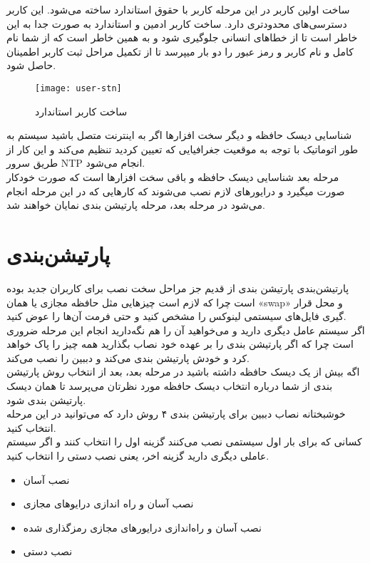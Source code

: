 \begin{frame}{ساخت اولین کاربر}
  در این مرحله کاربر با حقوق استاندارد ساخته می‌شود. این کاربر دسترسی‌های محدودتری دارد. ساخت کاربر ادمین و استاندارد به صورت جدا به این خاطر است تا از خطاهای انسانی جلوگیری شود و به همین خاطر است که از شما نام کامل و نام کاربر و رمز عبور را دو بار میپرسد تا از تکمیل مراحل ثبت کاربر اطمینان حاصل شود.
  \begin{figure}
    \texttt{[image: user-stn]}
    \caption{ساخت کاربر استاندارد~\cite{fig:deb_user_stn}}
  \end{figure}
\end{frame}
\begin{frame}{شناسایی دیسک حافظه و دیگر سخت افزارها}
  اگر به اینترنت متصل باشید سیستم به طور اتوماتیک با توجه به موقعیت جغرافیایی که تعیین کردید تنظیم می‌کند و این کار از طریق سرور NTP انجام می‌شود.\\
  مرحله بعد شناسایی دیسک حافظه و باقی سخت افزارها است که صورت خودکار صورت میگیرد و درایورهای لازم نصب می‌شوند که کارهایی که در این مرحله انجام می‌شود در مرحله بعد، مرحله پارتیشن بندی نمایان خواهند شد.
\end{frame}
\section{پارتیشن‌بندی}
\begin{frame}{پارتیشن‌بندی}
  پارتیشن بندی از قدیم جز مراحل سخت نصب برای کاربران جدید بوده است چرا که لازم است چیزهایی مثل حافظه مجازی یا همان «swap» و محل قرار گیری فایل‌های سیستمی لینوکس را مشخص کنید و حتی فرمت آن‌ها را عوض کنید.\\
  اگر سیستم عامل دیگری دارید و می‌خواهید آن را هم نگه‌دارید انجام این مرحله ضروری است چرا که اگر پارتیشن بندی را بر عهده خود نصاب بگذارید همه چیز را پاک خواهد کرد و خودش پارتیشن بندی می‌کند و دببین را نصب می‌کند.\\
  اگه بیش از یک دیسک حافظه داشته باشید در مرحله بعد، بعد از انتخاب روش پارتیشن بندی از شما درباره انتخاب دیسک حافظه مورد نظرتان می‌پرسد تا همان دیسک پارتیشن بندی شود.\\
  خوشبختانه نصاب دببین برای پارتیشن بندی ۴ روش دارد که می‌توانید در این مرحله انتخاب کنید.\\
  کسانی که برای بار اول سیستمی نصب می‌کنند گزینه اول را انتخاب کنند و اگر سیستم عاملی دیگری دارید گزینه اخر، یعنی نصب دستی را انتخاب کنید.\\
  \begin{itemize}
    \item نصب آسان
    \item نصب آسان و راه اندازی درایوهای مجازی
    \item نصب آسان و راه‌اندازی درایورهای مجازی رمزگذاری شده
    \item نصب دستی
  \end{itemize}
\end{frame}

